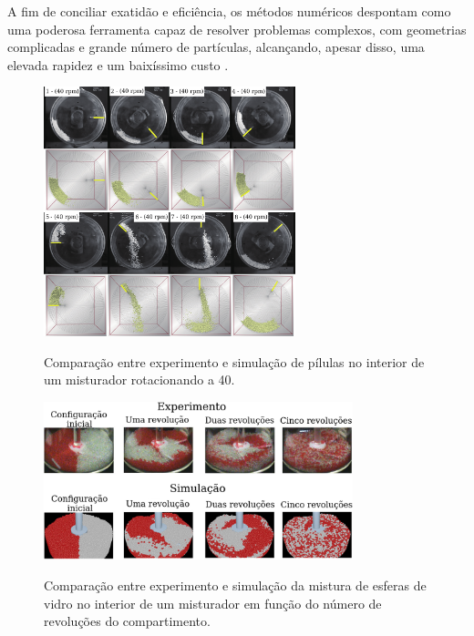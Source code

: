 A fim de conciliar exatidão e eficiência, os métodos numéricos despontam como uma poderosa ferramenta capaz de resolver problemas complexos, com geometrias complicadas e grande número de partículas, alcançando, apesar disso, uma elevada rapidez e um baixíssimo custo \cite{bib:maliska}.

\begin{figure}[h]
	\caption{Comparação entre experimento e simulação de pílulas no interior de um misturador rotacionando a \SI{40}{\rpm}.}
	\centering
		\includegraphics[width=0.65\textwidth]{images/introduction/pellet_flow_adapted.png}
	\label{fig:pellet_flow}
	\vspace{-0.5cm}
\end{figure}

\begin{figure}[h]
	\caption{Comparação entre experimento e simulação da mistura de esferas de vidro no interior de um misturador em função do número de revoluções do compartimento.}
	\centering
		\includegraphics[width=0.8\textwidth]{images/introduction/drug_production_adapted.png}
	\label{fig:drug_production}
	\vspace{-0.5cm}
\end{figure}

